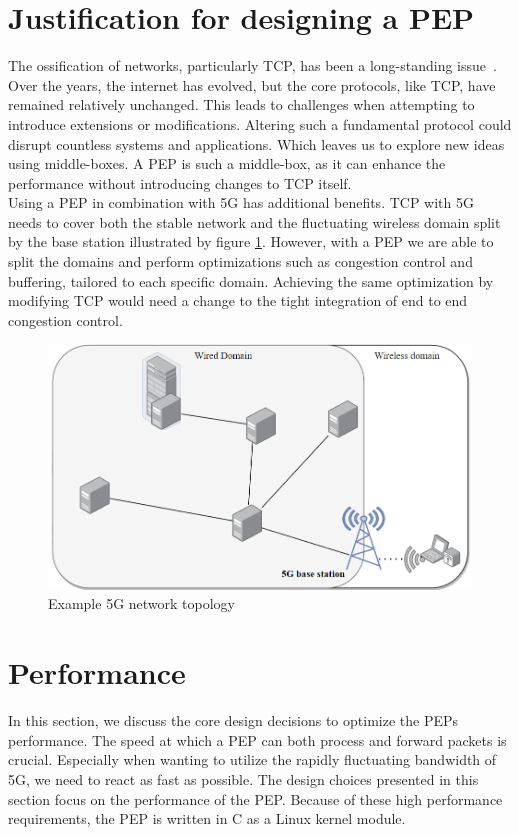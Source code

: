 \documentclass[a4paper,english, 11pt]{report}
\begin{document}
\section{Justification for designing a PEP}
The ossification of networks, particularly TCP, has been a long-standing issue~\cite{tcp_extendable}. Over the years, the internet has evolved, but the core protocols, like TCP, have remained relatively unchanged. This leads to challenges when attempting to introduce extensions or modifications. Altering such a fundamental protocol could disrupt countless systems and applications. Which leaves us to explore new ideas using middle-boxes. A PEP is such a middle-box, as it can enhance the performance without introducing changes to TCP itself.\\

Using a PEP in combination with 5G has additional benefits. TCP with 5G needs to cover both the stable network and the fluctuating wireless domain split by the base station illustrated by figure \ref{fig:5g_topology}. However, with a PEP we are able to split the domains and perform optimizations such as congestion control and buffering, tailored to each specific domain. Achieving the same optimization by modifying TCP would need a change to the tight integration of end to end congestion control.\\

\begin{figure}[h!] %
	\centering
	\includegraphics[scale=0.6]{../diagrams/drawio/deployment_without_pep.png}
  	\caption{Example 5G network topology}
  	\label{fig:5g_topology}
\end{figure}


\section{Performance}
In this section, we discuss the core design decisions to optimize the PEPs performance.
The speed at which a PEP can both process and forward packets is crucial. Especially when wanting to utilize the rapidly fluctuating bandwidth of 5G, we need to react as fast as possible. The design choices presented in this section focus on the performance of the PEP. Because of these high performance requirements, the PEP is written in C as a Linux kernel module. 
\end{document}
